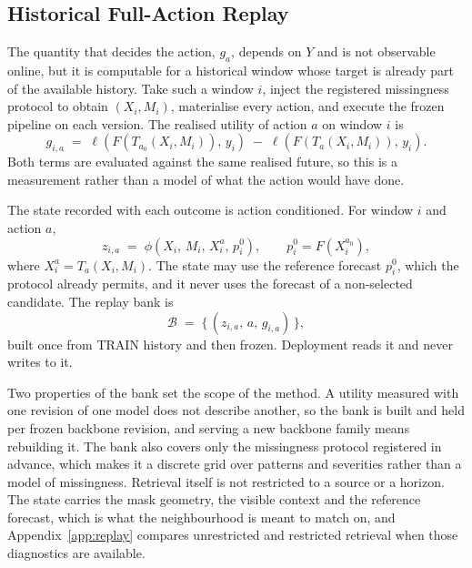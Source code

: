 \documentclass{article}
\newcommand{\calB}{\mathcal{B}}
\newcommand{\loss}{\ell}
\begin{document}
\subsection{Historical Full-Action Replay}
\label{sec:method-replay}
The quantity that decides the action, $g_a$, depends on $Y$ and is not observable online, but it
is computable for a historical window whose target is already part of the available history.
Take such a window $i$, inject the registered missingness protocol to obtain $(X_i, M_i)$,
materialise every action, and execute the frozen pipeline on each version. The realised utility
of action $a$ on window $i$ is
\begin{equation}
  g_{i,a} \;=\; \loss\!\left(F(T_{a_0}(X_i, M_i)),\, y_i\right)
  \;-\; \loss\!\left(F(T_{a}(X_i, M_i)),\, y_i\right).
  \label{eq:replay-gain}
\end{equation}
Both terms are evaluated against the same realised future, so this is a measurement rather
than a model of what the action would have done.

The state recorded with each outcome is action conditioned. For window $i$ and action $a$,
\begin{equation}
  z_{i,a} \;=\; \phi\!\left(X_i,\, M_i,\, X_i^{a},\, p_i^{0}\right),
  \qquad
  p_i^{0} = F(X_i^{a_0}),
  \label{eq:state}
\end{equation}
where $X_i^{a} = T_a(X_i, M_i)$. The state may use the reference forecast $p_i^0$, which the
protocol already permits, and it never uses the forecast of a non-selected candidate. The
replay bank is
\begin{equation}
  \calB \;=\; \bigl\{\, (z_{i,a},\, a,\, g_{i,a}) \,\bigr\},
  \label{eq:replay-bank}
\end{equation}
built once from TRAIN history and then frozen. Deployment reads it and never writes to it.

Two properties of the bank set the scope of the method. A utility measured with one revision
of one model does not describe another, so the bank is built and held per frozen backbone
revision, and serving a new backbone family means rebuilding it. The bank also covers only the
missingness protocol registered in advance, which makes it a discrete grid over patterns and
severities rather than a model of missingness. Retrieval itself is not restricted to a source
or a horizon. The state carries the mask geometry, the visible context and the reference
forecast, which is what the neighbourhood is meant to match on, and
Appendix~\ref{app:replay} compares unrestricted and restricted retrieval when those diagnostics
are available.
\end{document}

